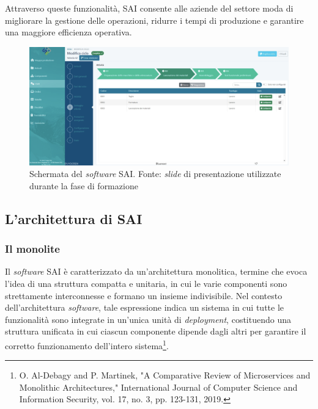         \vspace{0.2 em}
        \noindent Attraverso queste funzionalità, SAI consente alle aziende del settore moda di migliorare la gestione delle operazioni, ridurre i tempi di produzione e garantire una maggiore efficienza operativa.

        \begin{figure}[H]
            \centering
            \includegraphics[width=1.0\linewidth]{BCS-Tessi//images/schermata_SAI.png}
            \caption[Schermata del \textit{software} SAI di SogeaSoft S.r.l.]{Schermata del \textit{software} SAI. Fonte: \textit{slide} di presentazione utilizzate durante la fase di formazione}
            \label{fig:screenSAI}
        \end{figure}
        
        \subsection{L'architettura di SAI}
        
            \subsubsection{Il monolite}
            
            Il \textit{software} SAI è caratterizzato da un’architettura monolitica, termine che evoca l’idea di una struttura compatta e unitaria, in cui le varie componenti sono strettamente interconnesse e formano un insieme indivisibile. Nel contesto dell'architettura \textit{software}, tale espressione indica un sistema in cui tutte le funzionalità sono integrate in un’unica unità di \textit{deployment}, costituendo una struttura unificata in cui ciascun componente dipende dagli altri per garantire il corretto funzionamento dell’intero sistema\footnote{O. Al-Debagy and P. Martinek, "A Comparative Review of Microservices and Monolithic Architectures," International Journal of Computer Science and Information Security, vol. 17, no. 3, pp. 123-131, 2019.}.  

